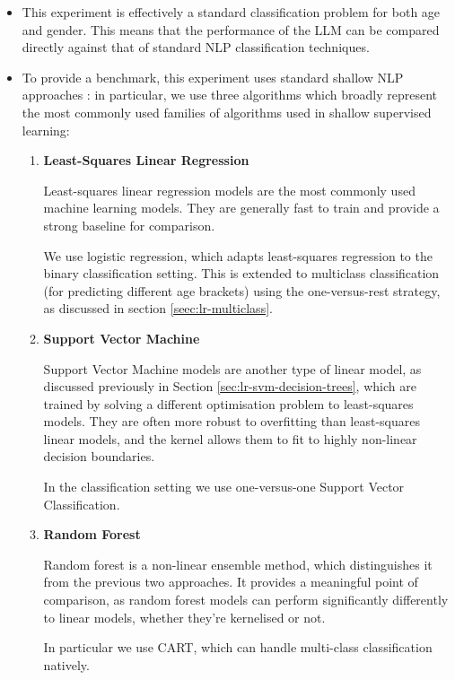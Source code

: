 \documentclass{report}
\begin{document}
\begin{itemize}
\item This experiment is effectively a standard classification problem for both age and gender. This means that the performance of the LLM can be compared directly against that of standard NLP classification techniques.

\item To provide a benchmark, this experiment uses standard shallow NLP approaches : in particular, we use three algorithms which broadly represent the most commonly used families of algorithms used in shallow supervised learning:

\begin{enumerate}
\item \textbf{Least-Squares Linear Regression}

Least-squares linear regression models are the most commonly used machine learning models. They are generally fast to train and provide a strong baseline for comparison.

We use logistic regression, which adapts least-squares regression to the binary classification setting. This is extended to multiclass classification (for predicting different age brackets) using the one-versus-rest strategy, as discussed in section \ref{seec:lr-multiclass}.

\item \textbf{Support Vector Machine}

Support Vector Machine models are another type of linear model, as discussed previously in Section \ref{sec:lr-svm-decision-trees}, which are trained by solving a different optimisation problem to least-squares models. They are often more robust to overfitting than least-squares linear models, and the kernel allows them to fit to highly non-linear decision boundaries.

In the classification setting we use one-versus-one Support Vector Classification.

\item \textbf{Random Forest}

Random forest is a non-linear ensemble method, which distinguishes it from the previous two approaches. It provides a meaningful point of comparison, as random forest models can perform significantly differently to linear models, whether they're kernelised or not.

In particular we use CART, which can handle multi-class classification natively.
\end{enumerate}


\end{itemize}
\end{document}
